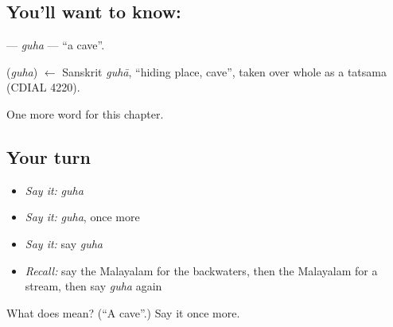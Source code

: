 \subsection*{You'll want to know: }
\textbf{} — \emph{guha} — \textquotedblleft{}a cave\textquotedblright{}.

\begin{cousinweb}
\textbf{} (\emph{guha}) $\leftarrow$ Sanskrit \emph{guhā}, \textquotedblleft{}hiding place, cave\textquotedblright{}, taken over whole as a tatsama (CDIAL 4220).
\end{cousinweb}

\begin{grammarlens}[title={What you've built}]
One more word for this chapter.
\end{grammarlens}

\subsection*{Your turn}
\begin{itemize}
\raggedright
  \item \emph{Say it:} \emph{guha}
  \item \emph{Say it:} \emph{guha}, once more
  \item \emph{Say it:} say \emph{guha}
  \item \emph{Recall:} say the Malayalam for the backwaters, then the Malayalam for a stream, then say \emph{guha} again
\end{itemize}

\begin{tcolorbox}[breakable,colback=teal!4,colframe=teal!35!black,title={Before you move on}]
What does  mean? (\textquotedblleft{}A cave\textquotedblright{}.) Say it once more.
\end{tcolorbox}
